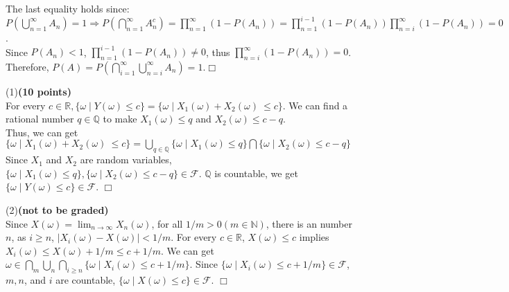 \documentclass{homework}
\begin{document}
The last equality holds since: \\
$P(\bigcup_{n=1}^{\infty}A_{n})=1 \Rightarrow P(\bigcap_{n=1}^{\infty}A_{n}^{c})=\prod_{n=1}^{\infty}(1-P(A_{n}))=\prod_{n=1}^{i-1}(1-P(A_{n}))\prod_{n=i}^{\infty}(1-P(A_{n}))=0$.\\
Since $P(A_{n})<1$, $\prod_{n=1}^{i-1}(1-P(A_{n})) \neq 0$, thus $\prod_{n=i}^{\infty}(1-P(A_{n}))=0$. \\
Therefore, $P(A)=P(\bigcap_{i=1}^{\infty}\bigcup_{n=i}^{\infty}A_{n})=1$.$\Box$


\question %
(1)\textbf{(10 points)}\\
For every $c \in \mathbb{R}, \{\omega \mid Y(\omega) \le c\}=\{\omega \mid X_{1}(\omega)+X_{2}(\omega)\ \le c\}$. We can find a rational number $q \in \mathbb{Q}$ to make $X_{1}(\omega) \le q$ and $X_{2}(\omega) \le c-q$. \\
Thus, we can get $\{\omega \mid X_{1}(\omega)+X_{2}(\omega)\ \le c\}=\bigcup_{q \in \mathbb{Q}}\{\omega \mid X_{1}(\omega) \le q\} \bigcap \{\omega \mid X_{2}(\omega) \le c-q\}$ \\
Since $X_{1}$ and $X_{2}$ are random variables, $\{\omega \mid X_{1}(\omega) \le q\},\{\omega \mid X_{2}(\omega) \le c-q\} \in \mathcal{F}$. $\mathbb{Q}$ is countable, we get $\{\omega \mid Y(\omega) \le c\} \in \mathcal{F}$. $\Box$

(2)\textbf{(not to be graded)}\\
Since $X(\omega)=\lim_{n \to \infty}X_{n}(\omega)$, for all $1/m > 0 (m \in \mathbb{N})$, 
there is an number $n$, as $i \ge n$, $\mid X_{i}(\omega)-X(\omega)\mid < 1/m$. 
For every $c \in \mathbb{R}$, $X(\omega) \le c$ implies $X_{i}(\omega) \le X(\omega)+1/m \le c + 1/m$. 
We can get $\omega \in \bigcap_{m}\bigcup_{n}\bigcap_{i\ge n}\{\omega \mid X_{i}(\omega)\le c+1/m\}$. 
Since $\{\omega \mid X_{i}(\omega)\le c+1/m\} \in \mathcal{F}$, $m, n$, and $i$ are countable, $\{\omega \mid X(\omega) \le c\} \in \mathcal{F}$. $\Box$ \\
\end{document}

